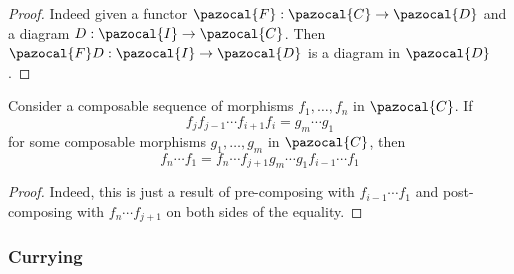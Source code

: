     \begin{proof}
        Indeed given a functor $\pazocal{F} : \pazocal{C}\rightarrow \pazocal{D}$ and a diagram $D : \pazocal{I} \rightarrow \pazocal{C}$. Then $\pazocal{F}D : \pazocal{I}\rightarrow \pazocal{D}$ is a diagram in $\pazocal{D}$.
    \end{proof}
    \begin{lemma}
        Consider a composable sequence of morphisms $f_1,\dots,f_n$ in $\pazocal{C}$. If 
        $$
            f_jf_{j-1}\cdots f_{i+1}f_i = g_m\cdots g_1
        $$
        for some composable morphisms $g_1,\dots,g_m$ in $\pazocal{C}$, then 
        $$
            f_n \cdots f_1 = f_n\cdots f_{j+1} g_m\cdots g_1 f_{i-1}\cdots f_1
        $$
    \end{lemma}
    \begin{proof}
        Indeed, this is just a result of pre-composing with $f_{i-1}\cdots f_1$ and post-composing with $f_n\cdots f_{j+1}$ on both sides of the equality. 
    \end{proof}
    
    
\subsubsection{Currying}